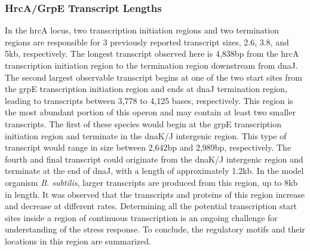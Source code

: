\subsubsection{HrcA/GrpE Transcript Lengths}
In the hrcA locus, two transcription initiation regions and two termination regions are responsible for 3 previously reported transcript sizes, 2.6, 3.8, and 5kb, respectively. The longest transcript observed here is 4,838bp from the hrcA transcription initiation region to the termination region downstream from dnaJ. The second largest observable transcript begins at one of the two start sites from the grpE transcription initiation region and ends at dnaJ termination region, leading to transcripts between 3,778 to 4,125 bases, respectively. This region is the most abundant portion of this operon and may contain at least two smaller transcripts. The first of these species would begin at the grpE transcription initiation region and terminate in the dnaK/J intergenic region. This type of transcript would range in size between 2,642bp and 2,989bp, respectively. The fourth and final transcript could originate from the dnaK/J intergenic region and terminate at the end of dnaJ, with a length of approximately 1.2kb. In the model organism \textit{B. subtilis}, larger transcripts are produced from this region, up to 8kb in length\cite{81}. It was observed that the transcripts and proteins of this region increase and decrease at different rates\cite{81}. Determining all the potential transcription start sites inside a region of continuous transcription is an ongoing challenge for understanding of the stress response. To conclude, the regulatory motifs and their locations in this region are summarized.

